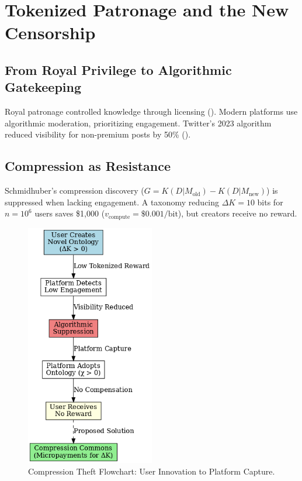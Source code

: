 \documentclass[12pt]{article}
\begin{document}
\section{Tokenized Patronage and the New Censorship}

\subsection{From Royal Privilege to Algorithmic Gatekeeping}

Royal patronage controlled knowledge through licensing (\citealp{Biagioli2002}). Modern platforms use algorithmic moderation, prioritizing engagement. Twitter’s 2023 algorithm reduced visibility for non-premium posts by 50\% (\citealp{Noble2018}).

\subsection{Compression as Resistance}

Schmidhuber’s compression discovery (\( G = K(D | M_{\text{old}}) - K(D | M_{\text{new}}) \)) is suppressed when lacking engagement. A taxonomy reducing \(\Delta K = 10\) bits for \( n = 10^6 \) users saves \$1,000 (\( v_{\text{compute}} = \$0.001/\text{bit} \)), but creators receive no reward.

\begin{figure}[h]
\centering
\includegraphics[width=0.5\textwidth]{compression_theft.png}
\caption{Compression Theft Flowchart: User Innovation to Platform Capture.}
\label{fig:compression}
\end{figure}
\end{document}
